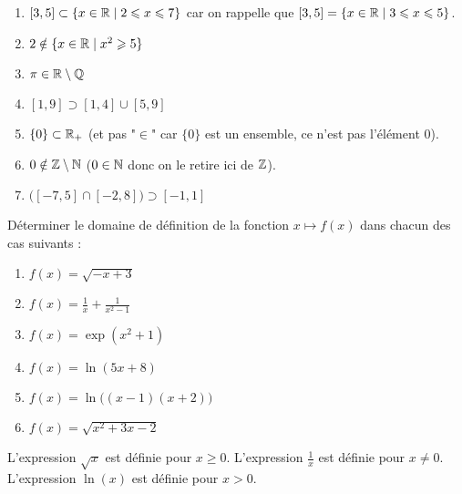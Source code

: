 \documentclass[11pt,class=report,crop=false]{standalone}
\begin{document}
\correction
\sauteligne
\begin{enumerate}
    \item $ [3,5] \subset \{ x \in \mathbb{R} \mid 2 \leqslant x \leqslant 7 \} $ car on rappelle que 
    $ [3,5] = \{ x \in \mathbb{R} \mid 3 \leqslant x \leqslant 5 \} $.

    \item $ 2 \notin \{ x \in \mathbb{R} \mid x^2 \geqslant 5 \} $
    
    \item $\pi  \in  \mathbb{R} \setminus \mathbb{Q} $
    
    \item $[1,9] \supset [1,4] \cup [5,9] $
    
    \item $\{ 0 \} \subset \mathbb{R}_+$ (et pas "$\in$" car $\{ 0 \}$ est un ensemble, ce n'est pas l'élément $0$). 

    \item $0 \notin \mathbb{Z} \setminus \mathbb{N} $ ($0 \in \mathbb{N}$ donc on le retire ici de $\mathbb{Z}$).
    
    \item $\big([-7,5] \cap [-2,8]\big) \supset [-1,1]$  
\end{enumerate}  
\fincorrection
\finexercice



\exercice{}
\enonce
Déterminer le domaine de définition de la fonction $x \mapsto f(x)$ dans chacun des cas suivants :
\begin{enumerate}
    \item $f(x) = \sqrt{-x+3}$
    \item $f(x) = \frac{1}{x} + \frac{1}{x^2-1}$
    \item $f(x) = \exp(x^2+1)$
    \item $f(x) = \ln( 5x + 8 )$
    \item $f(x) = \ln\big( (x-1)(x+2) \big)$
    \item $f(x) = \sqrt{ x^2+3x-2 }$
\end{enumerate} 
\finenonce

\indication
L'expression $\sqrt{x}$ est définie pour $x\ge0$.
L'expression $\frac1x$ est définie pour $x\neq0$.
L'expression $\ln(x)$ est définie pour $x>0$.
\finindication
\end{document}
